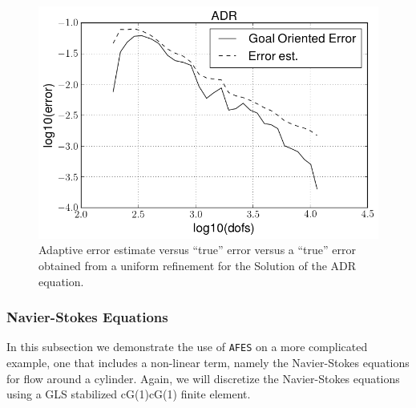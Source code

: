     
    
    \begin{figure}[H]
        \centering
        \includegraphics[scale=0.5]{Figures/AdaptiveADRkappa1E-1.png}
        \caption{Adaptive error estimate versus ``true'' error versus a ``true''
            error obtained from a uniform refinement for the Solution of the
            ADR equation.}
        \label{fig:ADR_EI}
    \end{figure}
\subsubsection{Navier-Stokes Equations} \label{sss:NSE}

    In this subsection we demonstrate the use of \texttt{AFES} on a more complicated
    example, one that includes a non-linear term, namely the Navier-Stokes
    equations for flow around a cylinder.  Again, we will discretize the
    Navier-Stokes equations using a GLS stabilized cG(1)cG(1) finite element.

